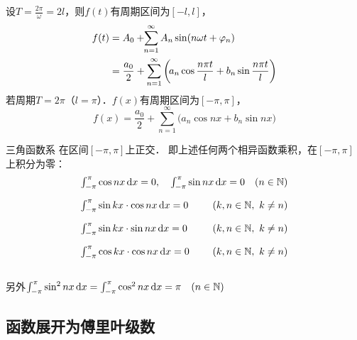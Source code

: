\documentclass[14pt,notheorems,leqno,xcolor={rgb}]{beamer} %
\begin{document}
\begin{frame}
设$T=\frac{2\pi}{\omega}=2l$，则$f(t)$有周期区间为$[-l,l]$，\pause
\begin{align*}
f(t)&=A_{0}+\negthickspace\sum_{n=1}^{\infty}A_{n}\sin(n\omega t+\varphi_{n}) \\
&=\frac{a_{0}}{2}+\sum_{n=1}^{\infty}\bigg(\!a_{n}\cos\frac{n\pi t}{l}+b_{n}\sin\frac{n\pi t}{l}\bigg)
\end{align*}
\cdotfill\vpause
若周期$T=2\pi$（$l=\pi$）．$f(x)$有周期区间为$[-\pi,\pi]$，
\[
f(x)=\frac{a_{0}}{2}+\sum_{n=1}^{\infty}\bigg(a_{n}\cos nx+b_{n}\sin nx\bigg)
\]
\end{frame}

\begin{frame}
\begin{property*}
三角函数系  在区间$[-\pi,\pi]$上正交．\pause
即上述任何两个相异函数乘积，在$[-\pi,\pi]$上积分为零：
\[
\begin{array}{ll}
\int_{-\pi}^{\pi}\cos nx\dx=0,\quad\int_{-\pi}^{\pi}\sin nx\dx=0\quad(n\in\mathbb{N})_{\vphantom{\big|_{\big|}}}\\
\int_{-\pi}^{\pi}\sin kx\cdot\cos nx\dx=0\quad\hfill(k, n\in\mathbb{N},\ k\neq n)_{\vphantom{\big|_{\big|}}}\\
\int_{-\pi}^{\pi}\sin kx\cdot\sin nx\dx=0\quad\hfill(k, n\in\mathbb{N},\ k\neq n)_{\vphantom{\big|_{\big|}}}\\
\int_{-\pi}^{\pi}\cos kx\cdot\cos nx\dx=0\quad\hfill(k, n\in\mathbb{N},\ k\neq n)_{\vphantom{\big|_{\big|}}}
\end{array}
\]%
\noindent
\end{property*}
\vspace{-1em}\cdotfill\ppause
另外$\int_{-\pi}^{\pi}\sin^{2}nx\mathop{}\!\mathrm{d} x=\int_{-\pi}^{\pi}\cos^{2}nx\mathop{}\!\mathrm{d} x=\pi\quad(n\in\mathbb{N})$
\end{frame}

\subsection{函数展开为傅里叶级数}
\end{document}
